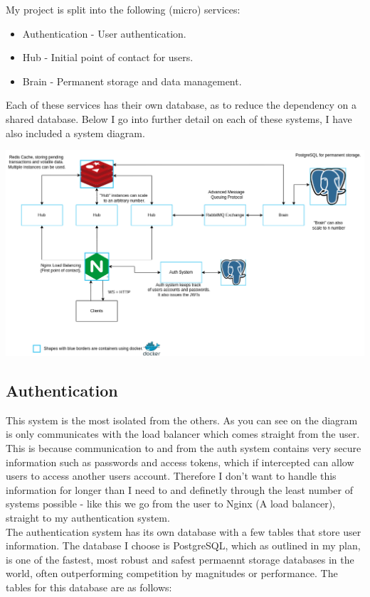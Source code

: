 \documentclass[titlepage]{article}
\begin{document}
My project is split into the following (micro) services:
\begin{itemize}
  \item Authentication - User authentication.
  \item Hub - Initial point of contact for users.
  \item Brain - Permanent storage and data management.
\end{itemize}

Each of these services has their own database, as to reduce the dependency on a shared database. Below I go into further detail on each of these systems, I have also included a system diagram.

\hspace*{-3cm}
\includegraphics[width=1.5\textwidth]{Architecture.png}

\subsection{Authentication}
This system is the most isolated from the others. As you can see on the diagram is only communicates with the load balancer which comes straight from the user. This is because communication to and from the auth system contains very secure information such as passwords and access tokens, which if intercepted can allow users to access another users account. Therefore I don't want to handle this information for longer than I need to and definetly through the least number of systems possible - like this we go from the user to Nginx (A load balancer), straight to my authentication system. \\

The authentication system has its own database with a few tables that store user information. The database I choose is PostgreSQL, which as outlined in my plan, is one of the fastest, most robust and safest permaennt storage databases in the world, often outperforming competition by magnitudes or performance. The tables for this database are as follows: \\
\end{document}
